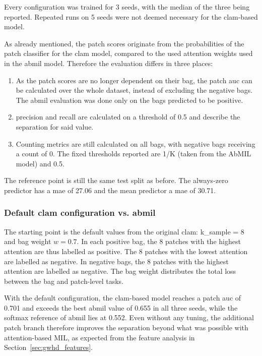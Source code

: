 \documentclass[12pt,parskip = half, DIV=classic,listof=totoc]{scrartcl}
\begin{document}
			Every configuration was trained for 3 seeds, with the median of the three being reported. Repeated runs on
			5 seeds were not deemed necessary for the \acs*{clam}-based model.

			As already mentioned, the patch scores originate from the probabilities of the patch classifier for the \ac{clam} model,
			compared to the used attention weights used in the \ac{abmil} model. Therefore the evaluation differs in three places:
			\begin{enumerate}
				\item As the patch scores are no longer dependent on their bag, the patch \ac{auc} can be calculated over the whole dataset, instead
				      of excluding the negative bags. The \ac{abmil} evaluation was done only on the bags predicted to be positive.
				\item precision and recall are calculated on a threshold of 0.5 and describe the separation for said value.
				\item Counting metrics are still calculated on all bags, with negative bags receiving a count of 0. The fixed thresholds reported are 1/K (taken from the AbMIL model) and 0.5.
			\end{enumerate}

			The reference point is still the same test split as before. The always-zero predictor has a \ac{mae} of 27.06 and the mean predictor a \ac{mae} of 30.71.

			\subsubsection{Default \acs*{clam} configuration vs. \acs*{abmil}}
			The starting point is the default values from the original \ac{clam}: k\_sample = 8 and
			bag weight $w = 0.7$. In each positive bag, the 8 patches with the
			highest attention are thus labelled as positive. The 8 patches with the lowest attention
			are labelled as negative. In negative bags, the 8 patches with the highest attention are labelled as negative. 
			The bag weight distributes the total loss between the bag and patch-level tasks.

			With the default configuration, the \acs*{clam}-based model reaches a patch \ac{auc} of 0.701 and exceeds the 
			best \ac{abmil} value of 0.655 in all three seeds, while the softmax reference of \ac{abmil} lies at 0.552. 
			Even without any tuning, the additional patch branch therefore improves the separation beyond what was possible with attention-based MIL, 
			as expected from the feature analysis in Section~\ref{sec:gwhd_features}.
\end{document}
